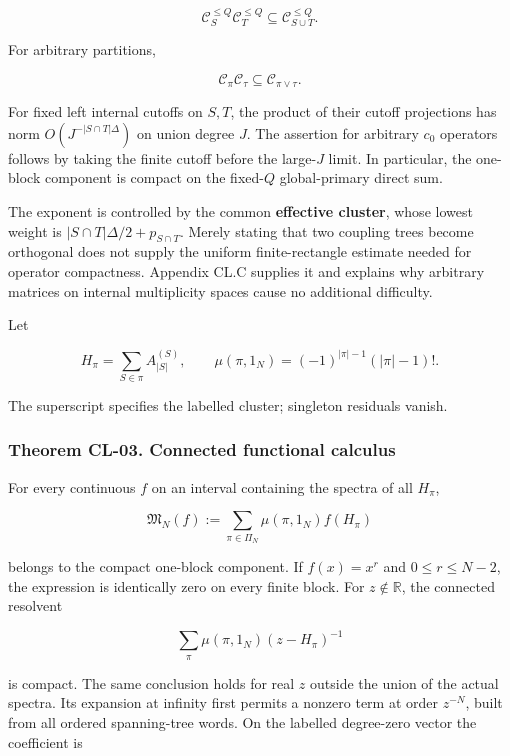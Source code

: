 \[
\mathcal C_S^{\leq Q}\mathcal C_T^{\leq Q}
\subseteq\mathcal C_{S\cup T}^{\leq Q}.
\]

For arbitrary partitions,

\[
\mathcal C_\pi\mathcal C_\tau\subseteq\mathcal C_{\pi\vee\tau}.
\tag{CL.6}
\]

For fixed left internal cutoffs on \(S,T\), the product of their cutoff projections has norm \(O(J^{-|S\cap T|\Delta})\) on union degree \(J\). The assertion for arbitrary \(c_0\) operators follows by taking the finite cutoff before the large-\(J\) limit. In particular, the one-block component is compact on the fixed-\(Q\) global-primary direct sum.

The exponent is controlled by the common \textbf{effective cluster}, whose lowest weight is \(|S\cap T|\Delta/2+p_{S\cap T}\). Merely stating that two coupling trees become orthogonal does not supply the uniform finite-rectangle estimate needed for operator compactness. Appendix CL.C supplies it and explains why arbitrary matrices on internal multiplicity spaces cause no additional difficulty.

Let

\[
H_\pi=\sum_{S\in\pi}A_{|S|}^{(S)},\qquad
\mu(\pi,1_N)=(-1)^{|\pi|-1}(|\pi|-1)!.
\]

The superscript specifies the labelled cluster; singleton residuals vanish.

\hypertarget{theorem-cl-03.-connected-functional-calculus}{%
\subsubsection{Theorem CL-03. Connected functional calculus}\label{theorem-cl-03.-connected-functional-calculus}}

For every continuous \(f\) on an interval containing the spectra of all \(H_\pi\),

\[
\mathfrak M_N(f):=
\sum_{\pi\in\Pi_N}\mu(\pi,1_N)f(H_\pi)
\tag{CL.7}
\]

belongs to the compact one-block component. If \(f(x)=x^r\) and \(0\leq r\leq N-2\), the expression is identically zero on every finite block. For \(z\notin\mathbb R\), the connected resolvent

\[
\sum_\pi\mu(\pi,1_N)(z-H_\pi)^{-1}
\]

is compact. The same conclusion holds for real \(z\) outside the union of the actual spectra. Its expansion at infinity first permits a nonzero term at order \(z^{-N}\), built from all ordered spanning-tree words. On the labelled degree-zero vector the coefficient is


